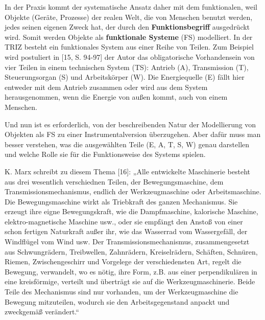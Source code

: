 \documentclass[11pt,a4paper]{article}
\begin{document}
In der Praxis kommt der systematische Ansatz daher mit dem funktionalen, weil
Objekte (Geräte, Prozesse) der realen Welt, die von Menschen benutzt werden,
jedes seinen eigenen Zweck hat, der durch den \textbf{Funktionsbegriff}
ausgedrückt wird.  Somit werden Objekte als \textbf{funktionale Systeme} (FS)
modelliert.  In der TRIZ besteht ein funktionales System aus einer Reihe von
Teilen.  Zum Beispiel wird postuliert in [15, S. 94-97] der Autor das
obligatorische Vorhandensein von vier Teilen in einem technischen System (TS):
Antrieb (A), Transmission (T), Steuerungsorgan (S) und Arbeitskörper (W). Die
Energiequelle (E) fällt hier entweder mit dem Antrieb zusammen oder wird aus
dem System herausgenommen, wenn die Energie von außen kommt, auch von einem
Menschen.

Und nun ist es erforderlich, von der beschreibenden Natur der Modellierung von
Objekten als FS zu einer Instrumentalversion überzugehen. Aber dafür muss man
besser verstehen, was die ausgewählten Teile (E, A, T, S, W) genau darstellen
und welche Rolle sie für die Funktionsweise des Systems spielen.

K. Marx schreibt zu diesem Thema [16]: „Alle entwickelte Maschinerie besteht
aus drei wesentlich verschiednen Teilen, der Bewegungsmaschine, dem
Transmissionsmechanismus, endlich der Werkzeugmaschine oder Arbeitsmaschine.
Die Bewegungsmaschine wirkt als Triebkraft des ganzen Mechanismus. Sie erzeugt
ihre eigne Bewegungskraft, wie die Dampfmaschine, kalorische Maschine,
elektro-magnetische Maschine usw., oder sie empfängt den Anstoß von einer
schon fertigen Naturkraft außer ihr, wie das Wasserrad vom Wassergefäll, der
Windflügel vom Wind usw. Der Transmissionsmechanismus, zusammengesetzt aus
Schwungrädern, Treibwellen, Zahnrädern, Kreiselrädern, Schäften, Schnüren,
Riemen, Zwischengeschirr und Vorgelege der verschiedensten Art, regelt die
Bewegung, verwandelt, wo es nötig, ihre Form, z.B. aus einer perpendikulären
in eine kreisförmige, verteilt und überträgt sie auf die Werkzeugmaschinerie.
Beide Teile des Mechanismus sind nur vorhanden, um der Werkzeugmaschine die
Bewegung mitzuteilen, wodurch sie den Arbeitsgegenstand anpackt und zweckgemäß
verändert.“
\end{document}
